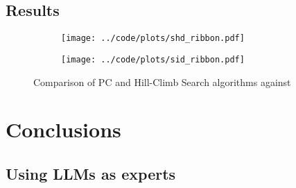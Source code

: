 \documentclass[letterpaper]{article} %
\begin{document}
\subsection{Results}
\begin{figure}
	\begin{subfigure}{0.5\textwidth}
		\centering
		\texttt{[image: ../code/plots/shd\_ribbon.pdf]}
		\caption{}
	\end{subfigure}
	\begin{subfigure}{0.5\textwidth}
		\centering
		\texttt{[image: ../code/plots/sid\_ribbon.pdf]}
		\caption{}
	\end{subfigure}
	\caption{Comparison of PC and Hill-Climb Search algorithms against }
\end{figure}

\section{Conclusions}
\subsection{Using LLMs as experts}


\end{document}
